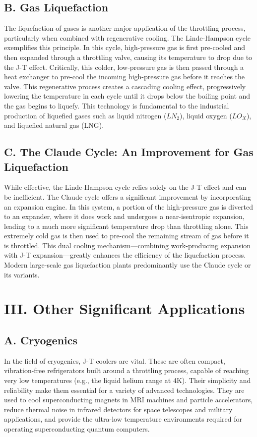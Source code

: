 \documentclass[aps,prl,reprint,groupedaddress]{revtex4-2}
\begin{document}
\subsection{B. Gas Liquefaction}
The liquefaction of gases is another major application of the throttling process, particularly when combined with regenerative cooling. The Linde-Hampson cycle exemplifies this principle. In this cycle, high-pressure gas is first pre-cooled and then expanded through a throttling valve, causing its temperature to drop due to the J-T effect. Critically, this colder, low-pressure gas is then passed through a heat exchanger to pre-cool the incoming high-pressure gas before it reaches the valve. This regenerative process creates a cascading cooling effect, progressively lowering the temperature in each cycle until it drops below the boiling point and the gas begins to liquefy. This technology is fundamental to the industrial production of liquefied gases such as liquid nitrogen ($LN_2$), liquid oxygen ($LO_X$), and liquefied natural gas (LNG).

\subsection{C. The Claude Cycle: An Improvement for Gas Liquefaction}
While effective, the Linde-Hampson cycle relies solely on the J-T effect and can be inefficient. The Claude cycle offers a significant improvement by incorporating an expansion engine. In this system, a portion of the high-pressure gas is diverted to an expander, where it does work and undergoes a near-isentropic expansion, leading to a much more significant temperature drop than throttling alone. This extremely cold gas is then used to pre-cool the remaining stream of gas before it is throttled. This dual cooling mechanism—combining work-producing expansion with J-T expansion—greatly enhances the efficiency of the liquefaction process. Modern large-scale gas liquefaction plants predominantly use the Claude cycle or its variants.

\section{III. Other Significant Applications}

\subsection{A. Cryogenics}
In the field of cryogenics, J-T coolers are vital. These are often compact, vibration-free refrigerators built around a throttling process, capable of reaching very low temperatures (e.g., the liquid helium range at 4K). Their simplicity and reliability make them essential for a variety of advanced technologies. They are used to cool superconducting magnets in MRI machines and particle accelerators, reduce thermal noise in infrared detectors for space telescopes and military applications, and provide the ultra-low temperature environments required for operating superconducting quantum computers.
\end{document}
